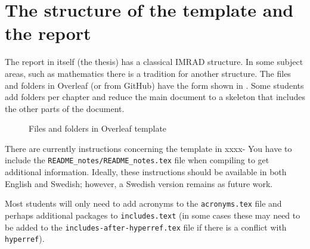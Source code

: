 \section{The structure of the template and the report}
The report in itself (\ie the thesis) has a classical IMRAD structure. In some subject areas, such as mathematics there is a tradition for another structure.
The files and folders in Overleaf (or from GitHub) have the form shown in . Some students add folders per chapter and reduce the main document to a skeleton that includes the other parts of the document.
\begin{figure}[!ht]
  \begin{center}
  \end{center}
  \caption{Files and folders in Overleaf template}
  \label{fig:overleafFoldersAndFiles}
\end{figure}
\FloatBarrier

There are currently instructions concerning the template in 
{xxxx- You have to include the \texttt{README\_notes/README\_notes.tex} file when compiling to get additional information.}
Ideally, these instructions should be available in both English and Swedish; however, a Swedish version remains as future work.

Most students will only need to add acronyms to the \texttt{acronyms.tex} file and perhaps additional packages to \texttt{includes.text} (in some cases these may need to be added to the \texttt{includes-after-hyperref.tex} file if there is a conflict with \texttt{hyperref}).

